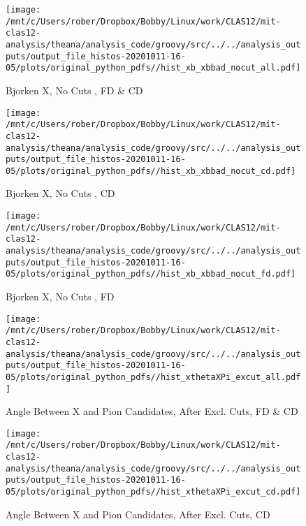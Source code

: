 \documentclass{article}
\begin{document}
\begin{landscape}
    \begin{figure}[h]
        \centering

        \texttt{[image: /mnt/c/Users/rober/Dropbox/Bobby/Linux/work/CLAS12/mit-clas12-analysis/theana/analysis\_code/groovy/src/../../analysis\_outputs/output\_file\_histos-20201011-16-05/plots/original\_python\_pdfs//hist\_xb\_xbbad\_nocut\_all.pdf]}
        \captionsetup{textformat=empty,labelformat=blank}
        \caption{Bjorken X, No Cuts , FD \& CD}
    \end{figure}
    \clearpage
    
    \begin{figure}[h]
        \centering

        \texttt{[image: /mnt/c/Users/rober/Dropbox/Bobby/Linux/work/CLAS12/mit-clas12-analysis/theana/analysis\_code/groovy/src/../../analysis\_outputs/output\_file\_histos-20201011-16-05/plots/original\_python\_pdfs//hist\_xb\_xbbad\_nocut\_cd.pdf]}
        \captionsetup{textformat=empty,labelformat=blank}
        \caption{Bjorken X, No Cuts , CD}
    \end{figure}
    \clearpage
    
    \begin{figure}[h]
        \centering

        \texttt{[image: /mnt/c/Users/rober/Dropbox/Bobby/Linux/work/CLAS12/mit-clas12-analysis/theana/analysis\_code/groovy/src/../../analysis\_outputs/output\_file\_histos-20201011-16-05/plots/original\_python\_pdfs//hist\_xb\_xbbad\_nocut\_fd.pdf]}
        \captionsetup{textformat=empty,labelformat=blank}
        \caption{Bjorken X, No Cuts , FD}
    \end{figure}
    \clearpage
    
    \begin{figure}[h]
        \centering

        \texttt{[image: /mnt/c/Users/rober/Dropbox/Bobby/Linux/work/CLAS12/mit-clas12-analysis/theana/analysis\_code/groovy/src/../../analysis\_outputs/output\_file\_histos-20201011-16-05/plots/original\_python\_pdfs//hist\_xthetaXPi\_excut\_all.pdf]}
        \captionsetup{textformat=empty,labelformat=blank}
        \caption{Angle Between X and Pion Candidates, After Excl. Cuts, FD \& CD}
    \end{figure}
    \clearpage
    
    \begin{figure}[h]
        \centering

        \texttt{[image: /mnt/c/Users/rober/Dropbox/Bobby/Linux/work/CLAS12/mit-clas12-analysis/theana/analysis\_code/groovy/src/../../analysis\_outputs/output\_file\_histos-20201011-16-05/plots/original\_python\_pdfs//hist\_xthetaXPi\_excut\_cd.pdf]}
        \captionsetup{textformat=empty,labelformat=blank}
        \caption{Angle Between X and Pion Candidates, After Excl. Cuts, CD}
    \end{figure}
    \clearpage
    

\end{landscape}
\end{document}
